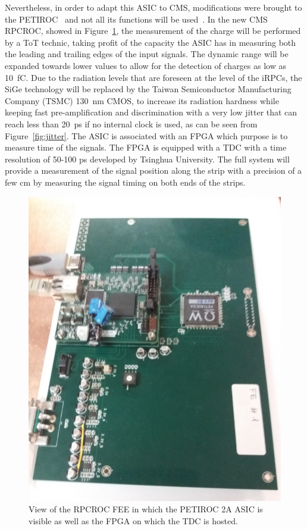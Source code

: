 	Nevertheless, in order to adapt this ASIC to CMS, modifications were brought to the PETIROC~\cite{PHASEIITP} and not all its functions will be used~\cite{COMBARET2018}. In the new CMS RPCROC, showed in Figure~\ref{fig:RPCROC}, the measurement of the charge will be performed by a \acf{ToT} technic, taking profit of the capacity the ASIC has in measuring both the leading and trailing edges of the input signals. The dynamic range will be expanded towards lower values to allow for the detection of charges as low as \SI{10}{fC}. Due to the radiation levels that are foreseen at the level of the iRPCs, the SiGe technology will be replaced by the Taiwan Semiconductor Manufacturing Company (TSMC) \SI{130}{nm} CMOS, to increase its radiation hardness while keeping fast pre-amplification and discrimination with a very low jitter that can reach less than \SI{20}{ps} if no internal clock is used, as can be seen from Figure~\ref{fig:jitter}. The ASIC is associated with an FPGA which purpose is to measure time of the signals. The FPGA is equipped with a TDC with a time resolution of 50-100 \si{ps} developed by Tsinghua University. The full system will provide a measurement of the signal position along the strip with a precision of a few \si{cm} by measuring the signal timing on both ends of the strips.

	\begin{figure}[H]
		\centering
		\includegraphics[width=0.5\linewidth]{fig/chapt6/RPCROC_FEE.png}
		\caption{\label{fig:RPCROC} View of the RPCROC \acl{FEE} in which the PETIROC 2A ASIC is visible as well as the FPGA on which the TDC is hosted.}
	\end{figure}

